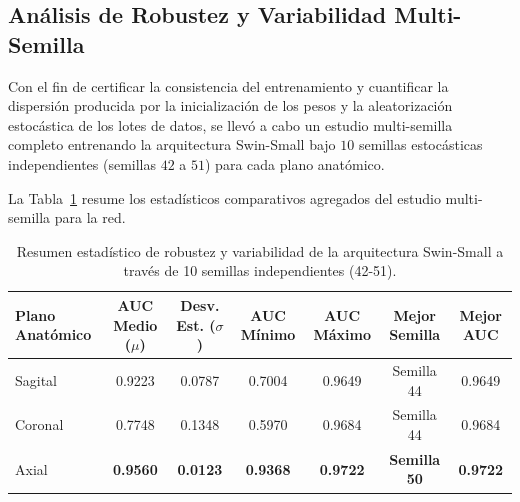 \subsection{Análisis de Robustez y Variabilidad Multi-Semilla}
Con el fin de certificar la consistencia del entrenamiento y cuantificar la dispersión producida por la inicialización de los pesos y la aleatorización estocástica de los lotes de datos, se llevó a cabo un estudio multi-semilla completo entrenando la arquitectura Swin-Small bajo $10$ semillas estocásticas independientes (semillas $42$ a $51$) para cada plano anatómico. 

La Tabla~\ref{tab:multiseed_swin} resume los estadísticos comparativos agregados del estudio multi-semilla para la red.

\begin{table}[htbp]
\centering
\caption{Resumen estadístico de robustez y variabilidad de la arquitectura Swin-Small a través de 10 semillas independientes (42-51).}
\label{tab:multiseed_swin}
\begin{tabular}{lcccccc}
\hline
\textbf{Plano Anatómico} & \textbf{AUC Medio ($\mu$)} & \textbf{Desv. Est. ($\sigma$)} & \textbf{AUC Mínimo} & \textbf{AUC Máximo} & \textbf{Mejor Semilla} & \textbf{Mejor AUC} \\ \hline
Sagital                  & 0.9223                     & 0.0787                         & 0.7004              & 0.9649              & Semilla 44             & 0.9649             \\
Coronal                  & 0.7748                     & 0.1348                         & 0.5970              & 0.9684              & Semilla 44             & 0.9684             \\
Axial                    & \textbf{0.9560}            & \textbf{0.0123}                & \textbf{0.9368}     & \textbf{0.9722}     & \textbf{Semilla 50}    & \textbf{0.9722}    \\ \hline
\end{tabular}
\end{table}

